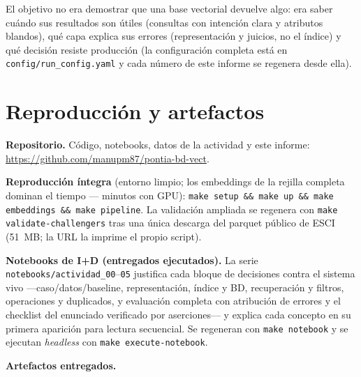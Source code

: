 \documentclass[10pt,twocolumn]{article}
\newcommand{\code}[1]{\texttt{\small #1}}
\begin{document}
El objetivo no era demostrar que una base vectorial devuelve algo: era saber
cuándo sus resultados son útiles (consultas con intención clara y atributos
blandos), qué capa explica sus errores (representación y juicios, no el
índice) y qué decisión resiste producción (la configuración completa está en
\code{config/run\_config.yaml} y cada número de este informe se regenera
desde ella).

\appendix

\section{Reproducción y artefactos}

\textbf{Repositorio.} Código, notebooks, datos de la actividad y este
informe: \url{https://github.com/manupm87/pontia-bd-vect}.

\textbf{Reproducción íntegra} (entorno limpio; los embeddings de la rejilla
completa dominan el tiempo --- minutos con GPU): \code{make setup \&\& make
up \&\& make embeddings \&\& make pipeline}. La validación ampliada se
regenera con \code{make validate-challengers} tras una única descarga del
parquet público de ESCI (51~MB; la URL la imprime el propio script).

\textbf{Notebooks de I+D (entregados ejecutados).} La serie
\code{notebooks/actividad\_00}--\code{05} justifica cada bloque de
decisiones contra el sistema vivo ---caso/datos/baseline, representación,
índice y BD, recuperación y filtros, operaciones y duplicados, y evaluación
completa con atribución de errores y el checklist del enunciado verificado
por aserciones--- y explica cada concepto en su primera aparición para
lectura secuencial. Se regeneran con \code{make notebook} y se ejecutan
\emph{headless} con \code{make execute-notebook}.

\textbf{Artefactos entregados.}
\end{document}
